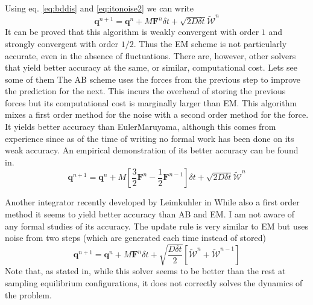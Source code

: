 \documentclass[ twoside,openright,titlepage,numbers=noenddot,%
headinclude,footinclude,cleardoublepage=empty,abstract=on,
BCOR=5mm,paper=a4,fontsize=11pt, dvipsnames
]{scrreprt}
\renewcommand{\vec}[1]{\bm{#1}}
\newcommand{\dt}{\delta t}
\newcommand{\half}{\frac{1}{2}}
\newcommand{\noise}{\widetilde{W}}
\newcommand{\ppos}{q}
\begin{document}
Using eq. \eqref{eq:bddis} and \eqref{eq:itonoise2} we can write
\begin{equation}
  \label{eq:eulermaruyama}
  \vec{\ppos}^{n+1} = \vec{\ppos}^n + M\vec{F}^n\dt + \sqrt{2D\dt}\vec{\mathcal{\noise}}^n
\end{equation}
It can be proved that this algorithm is weakly convergent with order $1$ and strongly convergent with order $1/2$\cite{Kloeden2011}. Thus the \gls{EM} scheme is not particularly accurate, even in the absence of fluctuations.
There are, however, other solvers that yield better accuracy at the same, or similar, computational cost. Lets see some of them
The \gls{AB} scheme uses the forces from the previous step to improve the prediction for the next. This incurs the overhead of storing the previous forces but its computational cost is marginally larger than \gls{EM}. This algorithm mixes a first order method for the noise with a second order method for the force. It yields better accuracy than EulerMaruyama, although this comes from experience since as of the time of writing no formal work has been done on its weak accuracy. An empirical demonstration of its better accuracy can be found in\cite{Balboa2017}.
\begin{equation}
  \vec{\ppos}^{n+1} = \vec{\ppos}^n + M\left[\frac{3}{2}\vec{F}^n - \half \vec{F}^{n-1}\right]\dt + \sqrt{2D\dt}\vec{\mathcal{\noise}}^n
\end{equation}

Another integrator recently developed by Leimkuhler in\cite{Leimkuhler2015}
 While also a first order method it seems to yield better accuracy than \gls{AB} and \gls{EM}. I am not aware of any formal studies of its accuracy.
 The update rule is very similar to \gls{EM} but uses noise from two steps (which are generated each time instead of stored)
 \begin{equation}
  \vec{\ppos}^{n+1} = \vec{\ppos}^n + M\vec{F}^n\dt + \sqrt{\frac{D\dt}{2}}\left[\vec{\mathcal{\noise}}^n + \vec{\mathcal{\noise}}^{n-1}\right]
\end{equation}
Note that, as stated in\cite{Leimkuhler2015}, while this solver seems to be better than the rest at sampling equilibrium configurations, it does not correctly solves the dynamics of the problem.
\end{document}
